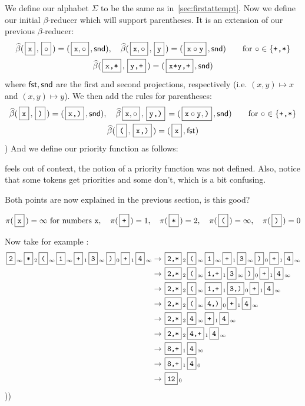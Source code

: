 \documentclass{llncs}
\newcommand{\yoni}[1]{{\begin{mdframed}[linecolor=red]{\color{red}#1}\end{mdframed}}}
\newcommand{\ari}[1]{{\begin{mdframed}[linecolor=blue]{\color{blue}#1}\end{mdframed}}}
\begin{document}
\begin{example}

    We define our alphabet $\Sigma$ to be the same as in~\ref{sec:firstattempt}.
    Now we define our initial $\beta$-reducer which will support parentheses.
    It is an extension of our previous $\beta$-reducer:
    \begin{gather*}
        \hb(\mbt x,\mb\circ) = (\mb{\ttt x,\circ},\snd),\quad \hb(\mb{\ttt x,\circ},\mbt y) = (\mb{\ttt x\circ\ttt y},\snd) \qquad \hbox{for $\circ\in\set{\ttt{+,*}}$} \\
        \hb(\mbt{x,*},\mbt{y,+}) = (\mbt{x*y,+},\snd)
    \end{gather*}
    where $\mathsf{fst},\mathsf{snd}$ are the first and second projections, respectively (i.e. $(x,y)\mapsto x$ and $(x,y)\mapsto y$).
    We then add the rules for parentheses:
    \begin{gather*}
        \hb(\mbt x,\mbt)) = (\mbt{x,)},\snd),\quad \hb{\mb{\ttt x,\circ},\mbt{y,)}} = (\mb{\ttt x\circ\ttt y,\ttt)},\snd) \qquad \hbox{for $\circ\in\set{\ttt{+,*}}$} \\
        \hb(\mbt(,\mbt{x,)}) = (\mbt x,\fst)
    \end{gather*}
    \gobble) %
    And we define our priority function as follows:
    \yoni{feels out of context, the notion of a priority function
    was not defined. Also, notice that some tokens get priorities and some don't, which is a bit confusing.}
    \ari{Both points are now explained in the previous section, is this good?}
    \[ \pi(\mbt x) = \infty\hbox{ for numbers \ttt x},\quad \pi(\mbt+) = 1,\quad \pi(\mbt*) = 2,\quad \pi(\mbt() = \infty,\quad \pi(\mbt)) = 0 \]
    
    Now take for example :
    \begin{align*}
        \mbt2_\oo \mbt*_2 \mbt(_\oo \mbt1_\oo \mbt+_1 \mbt3_\oo \mbt)_0 \mbt+_1 \mbt4_\oo &\to \mbt{2,*}_2 \mbt(_\oo \mbt1_\oo \mbt+_1 \mbt3_\oo \mbt)_0 \mbt+_1 \mbt4_\oo\\
            &\to \mbt{2,*}_2 \mbt(_\oo \mbt{1,+}_1 \mbt3_\oo \mbt)_0\mbt+_1 \mbt4_\oo\\
            &\to \mbt{2,*}_2 \mbt(_\oo \mbt{1,+}_1 \mbt{3,)}_0 \mbt+_1 \mbt4_\oo\\
            &\to \mbt{2,*}_2 \mbt(_\oo \mbt{4,)}_0 \mbt+_1 \mbt4_\oo\\
            &\to \mbt{2,*}_2 \mbt4_\oo \mbt+_1 \mbt4_\oo\\
            &\to \mbt{2,*}_2 \mbt{4,+}_1 \mbt4_\oo\\
            &\to \mbt{8,+}_1 \mbt4_\oo\\
            &\to \mbt{8,+}_1 \mbt4_0\\
            &\to \mbt{12}_0
    \end{align*}
    \gobble)\gobble)

\end{example}
\end{document}
